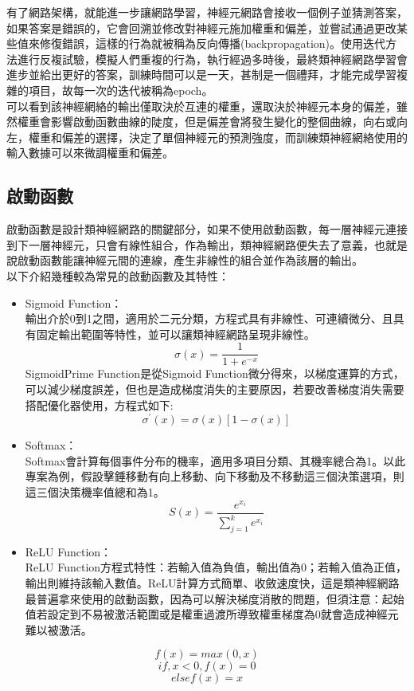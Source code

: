 \documentclass[14pt,a4paper]{report}  %
\begin{document}
 有了網路架構，就能進一步讓網路學習，神經元網路會接收一個例子並猜測答案，如果答案是錯誤的，它會回溯並修改對神經元施加權重和偏差，並嘗試通過更改某些值來修復錯誤，這樣的行為就被稱為反向傳播(backpropagation)。使用迭代方法進行反複試驗，模擬人們重複的行為，執行經過多時後，最終類神經網路學習會進步並給出更好的答案，訓練時間可以是一天，甚制是一個禮拜，才能完成學習複雜的項目，故每一次的迭代被稱為epoch。\\

 可以看到該神經網絡的輸出僅取決於互連的權重，還取決於神經元本身的偏差，雖然權重會影響啟動函數曲線的陡度，但是偏差會將發生變化的整個曲線，向右或向左，權重和偏差的選擇，決定了單個神經元的預測強度，而訓練類神經網絡使用的輸入數據可以來微調權重和偏差。\\
\subsection{啟動函數}
啟動函數是設計類神經網路的關鍵部分，如果不使用啟動函數，每一層神經元連接到下一層神經元，只會有線性組合，作為輸出，類神經網路便失去了意義，也就是說啟動函數能讓神經元間的連線，產生非線性的組合並作為該層的輸出。\\
以下介紹幾種較為常見的啟動函數及其特性：
\begin{itemize}
\item Sigmoid Function：\\
輸出介於0到1之間，適用於二元分類，方程式具有非線性、可連續微分、且具有固定輸出範圍等特性，並可以讓類神經網路呈現非線性。\\
$$\sigma(x)=\frac{1}{1+e^{-x}}$$
SigmoidPrime Function是從Sigmoid Function微分得來，以梯度運算的方式，可以減少梯度誤差，但也是造成梯度消失的主要原因，若要改善梯度消失需要搭配優化器使用，方程式如下:\\
$$\sigma^{'}(x)=\sigma(x)[1-\sigma(x)]$$
\item Softmax：\\
Softmax會計算每個事件分布的機率，適用多項目分類、其機率總合為1。以此專案為例，假設擊錘移動有向上移動、向下移動及不移動這三個決策選項，則這三個決策機率值總和為1。\\
$$S(x)=\frac{e^{x_i}}{\sum^k_{j=1}e^{x_i}}$$
\item ReLU Function：\\
ReLU Function方程式特性：若輸入值為負值，輸出值為0；若輸入值為正值，輸出則維持該輸入數值。ReLU計算方式簡單、收斂速度快，這是類神經網路最普遍拿來使用的啟動函數，因為可以解決梯度消散的問題，但須注意：起始值若設定到不易被激活範圍或是權重過渡所導致權重梯度為0就會造成神經元難以被激活。\\
\end{itemize}
$$f(x)=max(0,x)$$
$$if , x<0 , f(x)=0$$
$$else f(x)=x$$
\end{document}

